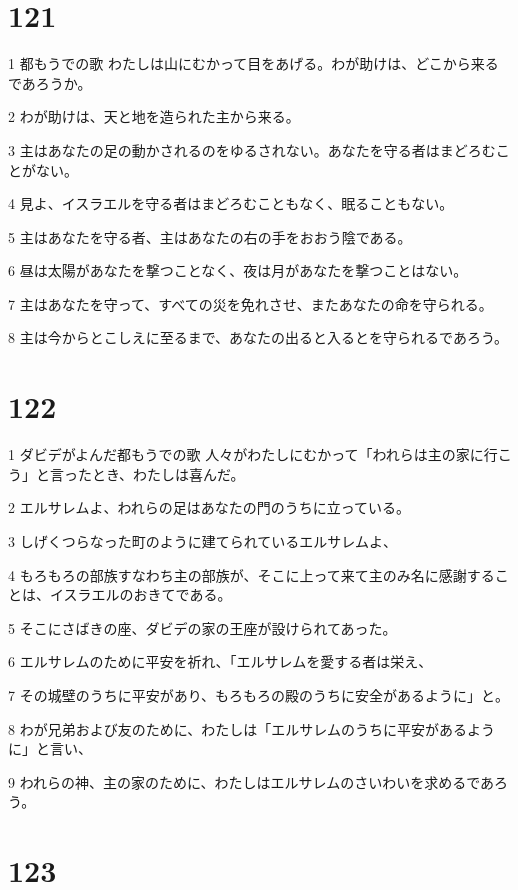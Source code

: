 \chapter{121}

\par 1 都もうでの歌 わたしは山にむかって目をあげる。わが助けは、どこから来るであろうか。
\par 2 わが助けは、天と地を造られた主から来る。
\par 3 主はあなたの足の動かされるのをゆるされない。あなたを守る者はまどろむことがない。
\par 4 見よ、イスラエルを守る者はまどろむこともなく、眠ることもない。
\par 5 主はあなたを守る者、主はあなたの右の手をおおう陰である。
\par 6 昼は太陽があなたを撃つことなく、夜は月があなたを撃つことはない。
\par 7 主はあなたを守って、すべての災を免れさせ、またあなたの命を守られる。
\par 8 主は今からとこしえに至るまで、あなたの出ると入るとを守られるであろう。

\chapter{122}

\par 1 ダビデがよんだ都もうでの歌 人々がわたしにむかって「われらは主の家に行こう」と言ったとき、わたしは喜んだ。
\par 2 エルサレムよ、われらの足はあなたの門のうちに立っている。
\par 3 しげくつらなった町のように建てられているエルサレムよ、
\par 4 もろもろの部族すなわち主の部族が、そこに上って来て主のみ名に感謝することは、イスラエルのおきてである。
\par 5 そこにさばきの座、ダビデの家の王座が設けられてあった。
\par 6 エルサレムのために平安を祈れ、「エルサレムを愛する者は栄え、
\par 7 その城壁のうちに平安があり、もろもろの殿のうちに安全があるように」と。
\par 8 わが兄弟および友のために、わたしは「エルサレムのうちに平安があるように」と言い、
\par 9 われらの神、主の家のために、わたしはエルサレムのさいわいを求めるであろう。

\chapter{123}

